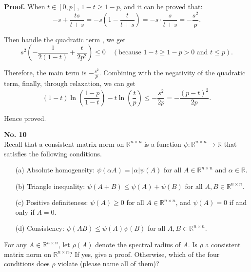 \documentclass[a4paper, 11pt]{article}
\newenvironment{problem}[2][No.]
    { \begin{mdframed}[backgroundcolor=gray!5] \textbf{#1 #2} \\}
    {  \end{mdframed}}
\newenvironment{solution}
    {\textbf{Proof.}}
    {}
\begin{document}
\begin{solution}
When \( t \in [0, p] \), \( 1 - t \geq 1 - p \), and it can be proved that:
$$
-s + \frac{ts}{t + s} = -s\left( 1 - \frac{t}{t + s} \right) = -s \cdot \frac{s}{t + s} = -\frac{s^2}{p}.
$$

Then handle the quadratic term , we get
$$
s^2\left( -\frac{1}{2(1 - t)} + \frac{t}{2p^2} \right) \leq 0 \quad (\text{because } 1 - t \geq 1 - p > 0 \text{ and } t \leq p).
$$

Therefore, the main term is \( -\frac{s^2}{p} \). Combining with the negativity of the quadratic term, finally, through relaxation, we can get
$$
(1 - t)\ln\left( \frac{1 - p}{1 - t} \right) - t\ln\left( \frac{t}{p} \right) \leq -\frac{s^2}{2p} = -\frac{(p - t)^2}{2p}.
$$

Hence proved.
\end{solution}

\begin{problem}{10}
	Recall that a consistent matrix norm on \( \mathbb{R}^{n \times n} \) is a function \( \psi : \mathbb{R}^{n \times n} \to \mathbb{R} \) that satisfies the following conditions.
	\begin{enumerate}
		\item[(a)] Absolute homogeneity: \( \psi(\alpha A) = |\alpha| \psi(A) \) for all \( A \in \mathbb{R}^{n \times n} \) and \( \alpha \in \mathbb{R} \).
		\item[(b)] Triangle inequality: \( \psi(A + B) \leq \psi(A) + \psi(B) \) for all \( A, B \in \mathbb{R}^{n \times n} \).
		\item[(c)] Positive definiteness: \( \psi(A) \geq 0 \) for all \( A \in \mathbb{R}^{n \times n} \), and \( \psi(A) = 0 \) if and only if \( A = 0 \).
		\item[(d)] Consistency: \( \psi(AB) \leq \psi(A) \psi(B) \) for all \( A, B \in \mathbb{R}^{n \times n} \).
	\end{enumerate}
	For any \( A \in \mathbb{R}^{n \times n} \), let \( \rho(A) \) denote the spectral radius of \( A \). Is \( \rho \) a consistent matrix norm on \( \mathbb{R}^{n \times n} \)? If yes, give a proof. Otherwise, which of the four conditions does \( \rho \) violate (please name all of them)?
\end{problem}
\end{document}

